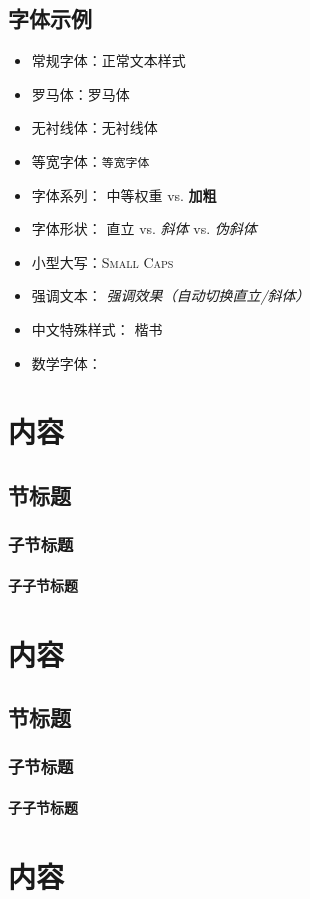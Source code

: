\documentclass[
    12pt, 
    a4paper,
    scheme=chinese, 
    oneside, 
    openany,   %
    fontset=yanming, 
    sub3section,
    linespread = 1.389
    ]{ctexbook}
\begin{document}
\section{字体示例}
\begin{itemize}
    \item 常规字体：正常文本样式
    \item 罗马体：\textrm{罗马体}
    \item 无衬线体：\textsf{无衬线体}
    \item 等宽字体：\texttt{等宽字体}
    
    \item 字体系列：
    \textmd{中等权重} vs. \textbf{加粗}
    
    \item 字体形状：
    \textup{直立} vs. \textit{斜体} vs. \textsl{伪斜体}
    
    \item 小型大写：\textsc{Small Caps}
    
    \item 强调文本：
    \emph{强调效果（自动切换直立/斜体）}
    
    \item 中文特殊样式：
    {\kaiti 楷书}      
    
    \item 数学字体：
\end{itemize}
\chapter{内容}
\zhlipsum[1,8]
\zhlipsum[1]
\section{节标题}
\zhlipsum[1]
\subsection{子节标题}
\zhlipsum[1]
\subsubsection{子子节标题}
\zhlipsum[1,8]
\zhlipsum[1,8]
\chapter{内容}
\zhlipsum[1]
\section{节标题}
\zhlipsum[1]
\subsection{子节标题}
\zhlipsum[1]
\subsubsection{子子节标题}
\zhlipsum[1,8]
\chapter{内容}
\zhlipsum[1,8]
\end{document}
